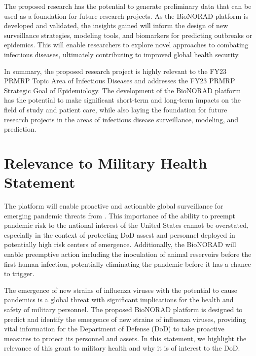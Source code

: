 \documentclass[onecolumn, compsoc,12pt]{IEEEtran}
\begin{document}
The proposed research has the potential to generate preliminary data that can be used as a foundation for future research projects. As the BioNORAD platform is developed and validated, the insights gained will inform the design of new surveillance strategies, modeling tools, and biomarkers for predicting outbreaks or epidemics. This will enable researchers to explore novel approaches to combating infectious diseases, ultimately contributing to improved global health security.

In summary, the proposed research project is highly relevant to the FY23 PRMRP Topic Area of Infectious Diseases and addresses the FY23 PRMRP Strategic Goal of Epidemiology. The development of the BioNORAD platform has the potential to make significant short-term and long-term impacts on the field of study and patient care, while also laying the foundation for future research projects in the areas of infectious disease surveillance, modeling, and prediction.


\clearpage

\section*{Relevance to Military Health Statement}

The \bnd platform will enable proactive and actionable global surveillance for emerging pandemic threats from \infl. This importance of the ability to preempt pandemic risk to the national interest of the United States cannot be overstated, especially in the context of protecting  DoD assest and personnel deployed in potentially high risk centers of emergence. Additionally, the BioNORAD will enable preemptive action including the inoculation of  animal reservoirs before the first human infection, potentially eliminating the pandemic before it has a chance to  trigger.


The emergence of new strains of influenza viruses with the potential to cause pandemics is a global threat with significant implications for the health and safety of military personnel. The proposed BioNORAD platform is designed to predict and identify the emergence of new strains of influenza viruses, providing vital information for the Department of Defense (DoD) to take proactive measures to protect its personnel and assets. In this statement, we highlight the relevance of this grant to military health and why it is of interest to the DoD.
\end{document}
